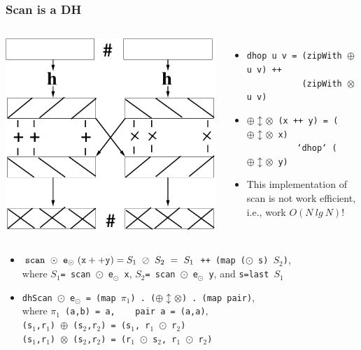 \documentclass{beamer}
\begin{document}
\begin{frame}[fragile,t]
  \frametitle{Scan is a DH}

\begin{columns}
\includegraphics[height=25ex]{Figures/DH}
\vspace{-3ex}
\begin{itemize}
    \item {\tt dhop u v = (zipWith $\oplus$ u v) ++}\\ 
          {\tt~~~~~~~~~~~(zipWith $\otimes$ u v)}
    \item {\tt $\oplus\updownarrow\otimes$ (x ++ y) = ($\oplus\updownarrow\otimes$ x)}\\
          {\tt~~~~~~~~~~`dhop` ($\oplus\updownarrow\otimes$ y)} 
    \item \alert{This implementation of scan is not work efficient,
                i.e., work $O(N \ lg \ N)$!}
\end{itemize}
\end{columns}


\begin{itemize}
    \item ${\tt scan} \ \odot \ {\tt e}_{\odot} \ {\tt(x++y)} = S_1~\oslash~S_2~=~S_1$
            {\tt ++ (map ($\odot$ s) $S_2$)},\\ 
            where $S_1${\tt = scan $\odot$ e$_{\odot}$ x},
                  $S_2${\tt = scan $\odot$ e$_{\odot}$ y}, and {\tt s=last $S_1$}\medskip
 
    \item {\tt dhScan $\odot$ e$_{\odot}$ = (map $\pi_1$) . ($\oplus\updownarrow\otimes$) . (map pair)},\\
            where {\tt $\pi_1$ (a,b) = a,~~~~pair a = (a,a)},\\
            {\tt (s$_1$,r$_1$) $\oplus$ (s$_2$,r$_2$) = (s$_1$, r$_1$ $\odot$ r$_2$)}\\
            {\tt (s$_1$,r$_1$) $\otimes$ (s$_2$,r$_2$) = (r$_1$ $\odot$ s$_2$, r$_1$ $\odot$ r$_2$)}
\end{itemize}

\end{frame}
\end{document}
